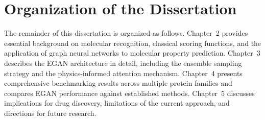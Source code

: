 \section{Organization of the Dissertation}

The remainder of this dissertation is organized as follows. Chapter~2 provides essential background on molecular recognition, classical scoring functions, and the application of graph neural networks to molecular property prediction. Chapter~3 describes the EGAN architecture in detail, including the ensemble sampling strategy and the physics-informed attention mechanism. Chapter~4 presents comprehensive benchmarking results across multiple protein families and compares EGAN performance against established methods. Chapter~5 discusses implications for drug discovery, limitations of the current approach, and directions for future research.
